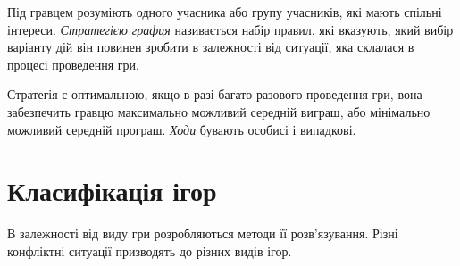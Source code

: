 \documentclass[12pt,a4paper]{book}
\begin{document}
Під гравцем розуміють одного учасника або групу учасників, які мають спільні інтереси. \emph{Стратегією графця} називається набір правил, які вказують, який вибір варіанту дій він повинен зробити в залежності від ситуації, яка склалася в процесі проведення гри.

Стратегія є оптимальною, якщо в разі багато разового проведення гри, вона забезпечить гравцю максимально можливий середній виграш, або мінімально можливий середній програш.
\emph{Ходи} бувають особисі і випадкові.

\section{Класифікація ігор}
В залежності від виду гри розробляються методи її розв'язування. Різні конфліктні ситуації призводять до різних видів ігор.
\end{document}
